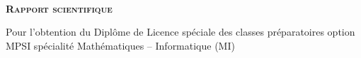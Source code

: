 \begin{titlepage}
\hspace{4cm}
\begin{minipage}{.2\textwidth}\hspace{-2cm}
{\vspace{1cm}}
\end{minipage}\hspace{-2cm}
\begin{minipage}{.4\textwidth}
\begin{center}
\end{center}
\end{minipage}\hspace{-1cm}
\begin{minipage}{.3\textwidth}\vspace{-3cm}
\end{minipage}\\
\begin{center}
\textsc{\large{\textbf{Rapport scientifique}}} 
\end{center}
\begin{center} Pour l'obtention du Diplôme de Licence spéciale des classes préparatoires option  MPSI spécialité  Mathématiques -- Informatique (MI) \end{center}


\end{titlepage}
